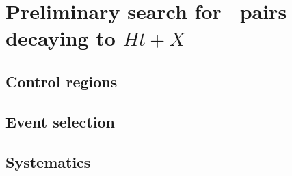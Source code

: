 
\section{Preliminary search for \TTbar\ pairs decaying to $Ht+X$}\label{sec:htx}

\subsection{Control regions}\label{sec:htxCR}

\subsection{Event selection}\label{sec:htxEVT}



\subsection{Systematics}\label{sec:htxSYS}

